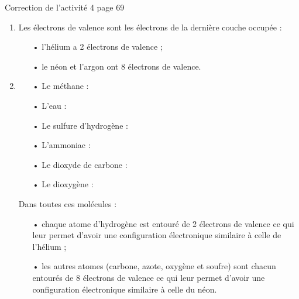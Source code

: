 \documentclass[12pt,a4paper,fleqn]{article}
\begin{document}
\begin{header}
Correction de l'activité 4 page 69
\end{header}

\begin{enumerate}
\item
Les électrons de valence sont les électrons de la dernière couche occupée :
\begin{itemize}
\item[•] l'hélium a 2 électrons de valence ;
\item[•] le néon et l'argon ont 8 électrons de valence.
\end{itemize}

\item
\begin{multicols}{3}
\begin{itemize}
\item[•]
Le méthane :
\begin{center}
\end{center}
\item[•]
L'eau :
\begin{center}
\end{center}
\item[•]
Le sulfure d'hydrogène :
\begin{center}
\end{center}
\item[•]
L'ammoniac :
\begin{center}
\end{center}
\item[•]
Le dioxyde de carbone :
\begin{center}
\end{center}
\item[•]
Le dioxygène :
\begin{center}
\end{center}
\end{itemize}
\end{multicols}
Dans toutes ces molécules :
\begin{itemize}
\item[•] chaque atome d'hydrogène est entouré de 2 électrons de valence ce qui leur permet d'avoir une configuration électronique similaire à celle de l'hélium ;
\item[•] les autres atomes (carbone, azote, oxygène et soufre) sont chacun entourés de 8 électrons de valence ce qui leur permet d'avoir une configuration électronique similaire à celle du néon.
\end{itemize}


\end{enumerate}
\end{document}
